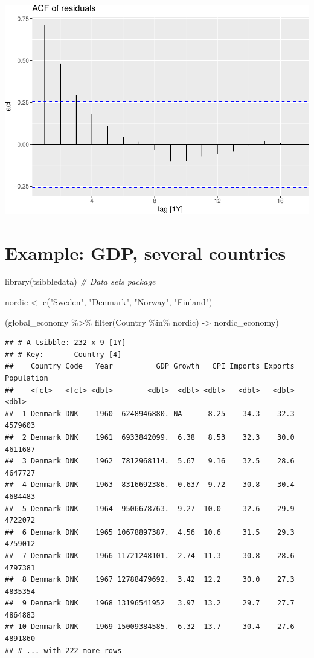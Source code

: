 \documentclass[
]{book}
\newenvironment{Shaded}{\begin{snugshade}}{\end{snugshade}}
\newcommand{\CommentTok}[1]{\textcolor[rgb]{0.56,0.35,0.01}{\textit{#1}}}
\newcommand{\FunctionTok}[1]{\textcolor[rgb]{0.00,0.00,0.00}{#1}}
\newcommand{\NormalTok}[1]{#1}
\newcommand{\OtherTok}[1]{\textcolor[rgb]{0.56,0.35,0.01}{#1}}
\newcommand{\SpecialCharTok}[1]{\textcolor[rgb]{0.00,0.00,0.00}{#1}}
\newcommand{\StringTok}[1]{\textcolor[rgb]{0.31,0.60,0.02}{#1}}
\begin{document}
\includegraphics{graphics/unnamed-chunk-37-1.pdf}

\hypertarget{example-gdp-several-countries}{%
\section{Example: GDP, several countries}\label{example-gdp-several-countries}}

\begin{Shaded}
\begin{Highlighting}[]
\FunctionTok{library}\NormalTok{(tsibbledata) }\CommentTok{\# Data sets package}

\NormalTok{nordic }\OtherTok{\textless{}{-}} \FunctionTok{c}\NormalTok{(}\StringTok{"Sweden"}\NormalTok{, }\StringTok{"Denmark"}\NormalTok{, }\StringTok{"Norway"}\NormalTok{, }\StringTok{"Finland"}\NormalTok{)}

\NormalTok{(global\_economy }\SpecialCharTok{\%\textgreater{}\%} \FunctionTok{filter}\NormalTok{(Country }\SpecialCharTok{\%in\%}\NormalTok{ nordic) }\OtherTok{{-}\textgreater{}}\NormalTok{ nordic\_economy)}
\end{Highlighting}
\end{Shaded}

\begin{verbatim}
## # A tsibble: 232 x 9 [1Y]
## # Key:       Country [4]
##    Country Code   Year          GDP Growth   CPI Imports Exports Population
##    <fct>   <fct> <dbl>        <dbl>  <dbl> <dbl>   <dbl>   <dbl>      <dbl>
##  1 Denmark DNK    1960  6248946880. NA      8.25    34.3    32.3    4579603
##  2 Denmark DNK    1961  6933842099.  6.38   8.53    32.3    30.0    4611687
##  3 Denmark DNK    1962  7812968114.  5.67   9.16    32.5    28.6    4647727
##  4 Denmark DNK    1963  8316692386.  0.637  9.72    30.8    30.4    4684483
##  5 Denmark DNK    1964  9506678763.  9.27  10.0     32.6    29.9    4722072
##  6 Denmark DNK    1965 10678897387.  4.56  10.6     31.5    29.3    4759012
##  7 Denmark DNK    1966 11721248101.  2.74  11.3     30.8    28.6    4797381
##  8 Denmark DNK    1967 12788479692.  3.42  12.2     30.0    27.3    4835354
##  9 Denmark DNK    1968 13196541952   3.97  13.2     29.7    27.7    4864883
## 10 Denmark DNK    1969 15009384585.  6.32  13.7     30.4    27.6    4891860
## # ... with 222 more rows
\end{verbatim}
\end{document}
